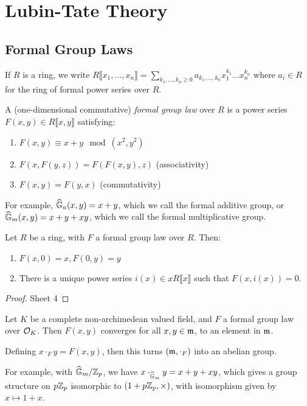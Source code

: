 \documentclass[10pt,a4paper]{article}
\begin{document}
\section{Lubin-Tate Theory}
\subsection{Formal Group Laws}
If $R$ is a ring, we write $R\llbracket x_1, \ldots, x_n \rrbracket = \sum_{k_1, \ldots, k_n \geq 0} a_{k_1,\ldots,k_n}x_1^{k_1}\ldots x_n^{k_n}$ where $a_i \in R$ for the ring of formal power series over $R$.
\begin{definition}
  A (one-dimensional commutative) \emph{formal group law} over $R$ is a power series $F(x, y) \in R\llbracket x,y\rrbracket$ satisfying:
  \begin{enumerate}
    \item $F(x,y) \equiv x+y \mod (x^2, y^2)$
    \item $F(x,F(y,z)) = F(F(x,y),z)$ (associativity)
    \item $F(x, y) = F(y,x)$ (commutativity)
  \end{enumerate}
\end{definition}
For example, $\widehat{\mathbb{G}}_a(x,y) = x+y$, which we call the formal additive group, or $\widehat{\mathbb{G}}_m(x,y) = x+y+xy$, which we call the formal multiplicative group.
\begin{lemma}
  Let $R$ be a ring, with $F$ a formal group law over $R$. Then:
  \begin{enumerate}
    \item $F(x,0) = x, F(0, y) = y$
    \item There is a unique power series $i(x) \in xR\llbracket x \rrbracket$ such that $F(x, i(x)) =0$.
  \end{enumerate}
\end{lemma}
\begin{proof}
  Sheet 4
\end{proof}
Let $K$ be a complete non-archimedean valued field, and $F$ a formal group law over $\mathcal{O}_K$. Then $F(x,y)$ converges for all $x, y \in \mathfrak{m}$, to an element in $\mathfrak{m}$.

Defining $x \cdot_F y = F(x,y)$, then this turns $(\mathfrak{m}, \cdot_F)$ into an abelian group.

For example, with $\widehat{\mathbb{G}}_m/\mathbb{Z}_p$, we have $x \cdot_{\widehat{\mathbb{G}}_m} y = x+y+xy$, which gives a group structure on $p\mathbb{Z}_p$ isomorphic to $(1+p\mathbb{Z}_p, \times)$, with isomorphism given by $x \mapsto 1+x$.
\end{document}
